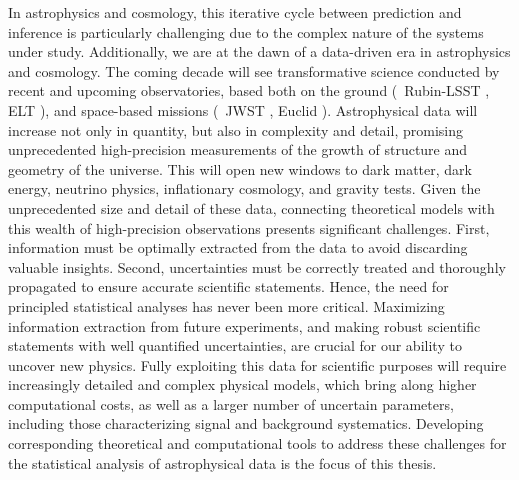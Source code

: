 In astrophysics and cosmology, this iterative cycle between prediction and inference is particularly challenging due to the complex nature of the systems under study. 
Additionally, we are at the dawn of a data-driven era in astrophysics and cosmology. The coming decade will see transformative science conducted by recent and upcoming observatories, based both on the ground (\eg\ Rubin-LSST \cite{LSSTDarkEnergyScience:2012kar}, ELT \cite{Simon:2019aa}), and space-based missions (\eg\ JWST \citep{Gardner:2006ky}, Euclid \cite{Refregier:2010ss}). Astrophysical data will increase not only in quantity, but also in complexity and detail, promising unprecedented high-precision measurements of the growth of structure and geometry of the universe. This will open new windows to dark matter, dark energy, neutrino physics, inflationary cosmology, and gravity tests. 
Given the unprecedented size and detail of these data, connecting theoretical models with this wealth of high-precision observations presents significant challenges. First, information must be optimally extracted from the data to avoid discarding valuable insights. Second, uncertainties must be correctly treated and thoroughly propagated to ensure accurate scientific statements. Hence, the need for principled statistical analyses has never been more critical. Maximizing information extraction from future experiments, and making robust scientific statements with well quantified uncertainties, are crucial for our ability to uncover new physics. Fully exploiting this data for scientific purposes will require increasingly detailed and complex physical models, which bring along higher computational costs, as well as a larger number of uncertain parameters, including those characterizing signal and background systematics. Developing corresponding theoretical and computational tools to address these challenges for the statistical analysis of astrophysical data is the focus of this thesis.

